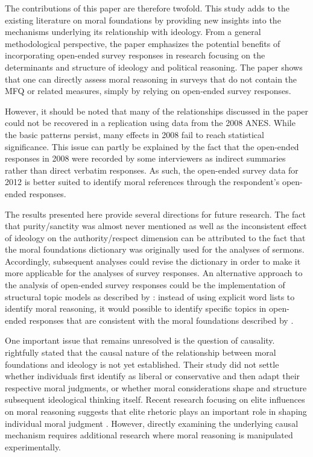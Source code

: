 \documentclass[12pt]{article}
\begin{document}
The contributions of this paper are therefore twofold. This study adds to the existing literature on moral foundations by providing new insights into the mechanisms underlying its relationship with ideology. From a general methodological perspective, the paper emphasizes the potential benefits of incorporating open-ended survey responses in research focusing on the determinants and structure of ideology and political reasoning. The paper shows that one can directly assess moral reasoning in surveys that do not contain the MFQ or related measures, simply by relying on open-ended survey responses.

However, it should be noted that many of the relationships discussed in the paper could not be recovered in a replication using data from the 2008 ANES. While the basic patterns persist, many effects in 2008 fail to reach statistical significance. This issue can partly be explained by the fact that the open-ended responses in 2008 were recorded by some interviewers as indirect summaries rather than direct verbatim responses. As such, the open-ended survey data for 2012 is better suited to identify moral references through the respondent's open-ended responses.

The results presented here provide several directions for future research. The fact that purity/sanctity was almost never mentioned as well as the inconsistent effect of ideology on the authority/respect dimension can be attributed to the fact that the moral foundations dictionary was originally used for the analyses of sermons. Accordingly, subsequent analyses could revise the dictionary in order to make it more applicable for the analyses of survey responses. An alternative approach to the analysis of open-ended survey responses could be the implementation of structural topic models as described by \citet{roberts2014structural}: instead of using explicit word lists to identify moral reasoning, it would possible to identify specific topics in open-ended responses that are consistent with the moral foundations described by \citet{haidt2008moral} \citep[see also][]{lin2008joint}.

One important issue that remains unresolved is the question of causality. \citet{graham2009liberals} rightfully stated that the causal nature of the relationship between moral foundations and ideology is not yet established. Their study did not settle whether individuals first identify as liberal or conservative and then adapt their respective moral judgments, or whether moral considerations shape and structure subsequent ideological thinking itself. Recent research focusing on elite influences on moral reasoning suggests that elite rhetoric plays an important role in shaping individual moral judgment \citep[see for example][]{clifford2013words,clifford2015concerns}. However, directly examining the underlying causal mechanism requires additional research where moral reasoning is manipulated experimentally.
\end{document}
